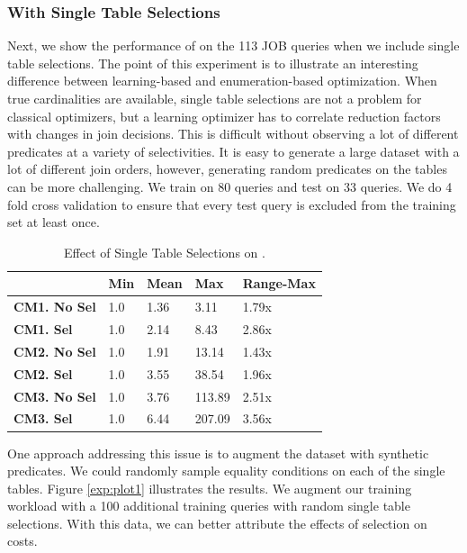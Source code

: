 \subsubsection{With Single Table Selections}
Next, we show the performance of \sys on the 113 JOB queries when we include single table selections. The point of this experiment is to illustrate an interesting difference between learning-based and enumeration-based optimization. When true cardinalities are available, single table selections are not a problem for classical optimizers, but a learning optimizer has to correlate reduction factors with changes in join decisions. This is difficult without observing a lot of different predicates at a variety of selectivities.
It is easy to generate a large dataset with a lot of different join orders, however, generating random predicates on the tables can be more challenging. We train on 80 queries and test on 33 queries. We do 4 fold cross validation to ensure that every test query is excluded from the training set at least once. 

\begin{table}[ht!]\centering \small
\caption{\small{Effect of Single Table Selections on \sys.}}\vspace{0.25em}
\begin{tabular}{|l|l|l|l|l|}\hline
    & {\bf Min}  & {\bf Mean}  & {\bf Max}    & {\bf Range-Max} \\ \hline
{\bf CM1. No Sel}  & 1.0  & 1.36   & 3.11    & 1.79x\\ \hline
{\bf CM1. Sel}  & 1.0  & 2.14   & 8.43    & 2.86x\\ \hline
{\bf CM2. No Sel}  & 1.0  & 1.91   & 13.14    & 1.43x\\ \hline
{\bf CM2. Sel}  & 1.0  & 3.55   & 38.54    & 1.96x\\ \hline
{\bf CM3. No Sel}  & 1.0  & 3.76   & 113.89    & 2.51x\\ \hline
{\bf CM3. Sel}  & 1.0  & 6.44   & 207.09    & 3.56x\\ \hline
\end{tabular}
\end{table}

One approach addressing this issue is to augment the dataset with synthetic predicates. We could randomly sample equality conditions on each of the single tables. Figure \ref{exp:plot1} illustrates the results. We augment our training workload with a 100 additional training queries with random single table selections. With this data, we can better attribute the effects of selection on costs.   

